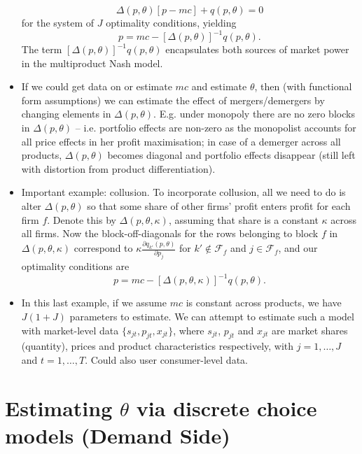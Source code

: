 \documentclass[11pt]{article}
\numberwithin{equation}{section}
\begin{document}
\begin{itemize}
	\begin{equation}
		\Delta(p,\theta)[p - mc] + q(p,\theta) = 0
	\end{equation}
	for the system of $J$ optimality conditions, yielding
	\begin{equation}
		p =  mc - [\Delta(p,\theta)]^{-1} q(p,\theta).
	\end{equation}
	The term $[\Delta(p,\theta)]^{-1} q(p,\theta)$ encapsulates both sources of market power in the multiproduct Nash model.
	\item If we could get data on or estimate $mc$ and estimate $\theta$, then (with functional form assumptions) we can estimate the effect of mergers/demergers by changing elements in $\Delta(p,\theta)$. E.g. under monopoly there are no zero blocks in $\Delta(p,\theta)$ -- i.e. portfolio effects are non-zero as the monopolist accounts for all price effects in her profit maximisation; in case of a demerger across all products, $\Delta(p,\theta)$ becomes diagonal and portfolio effects disappear (still left with distortion from product differentiation).
	\item Important example: collusion. To incorporate collusion, all we need to do is alter $\Delta(p,\theta)$ so that some share of other firms' profit enters profit for each firm $f$. Denote this by $\Delta(p,\theta,\kappa)$, assuming that share is a constant $\kappa$ across all firms. Now the block-off-diagonals for the rows belonging to block $f$ in $\Delta(p,\theta,\kappa)$ correspond to $\kappa\frac{\partial q_{k'}(p,\theta)}{\partial p_j}$ for $k'\notin \mathscr{F}_f$ and $j\in \mathscr{F}_f$, and our optimality conditions are
	\begin{equation}
	p =  mc - [\Delta(p,\theta, \kappa)]^{-1} q(p,\theta).
	\end{equation}
	\item In this last example, if we assume $mc$ is constant across products, we have $J(1+J)$ parameters to estimate. We can attempt to estimate such a model with market-level data $\{s_{jt}, p_{jt}, x_{jt}\}$, where $s_{jt}$, $p_{jt}$ and $x_{jt}$ are market shares (quantity), prices and product characteristics respectively, with $j=1,\dots,J$ and $t=1,\dots,T$. Could also user consumer-level data.
\end{itemize}

\section{Estimating $\theta$ via discrete choice models (Demand Side)}
\end{document}
